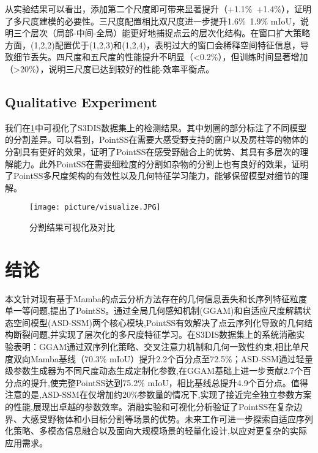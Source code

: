 \documentclass[preprint,12pt]{elsarticle}
\begin{document}
从实验结果可以看出，添加第二个尺度即可带来显著提升（+1.1\%~+1.4\%），证明了多尺度建模的必要性。三尺度配置相比双尺度进一步提升1.6\%~1.9\% mIoU，说明三个层次（局部-中间-全局）能更好地捕捉点云的层次化结构。在窗口扩大策略方面，(1,2,2)配置优于(1,2,3)和(1,2,4)，表明过大的窗口会稀释空间特征信息，导致细节丢失。四尺度和五尺度的性能提升不明显（<0.2\%），但训练时间显著增加（>20\%），说明三尺度已达到较好的性能-效率平衡点。



\subsection{Qualitative Experiment}
我们在\cref{fig:vis}中可视化了S3DIS数据集上的检测结果。其中划圈的部分标注了不同模型的分割差异。可以看到，PointSS在需要大感受野支持的窗户以及房柱等的物体的分割具有更好的效果，证明了PointSS在感受野融合上的优势、其具有多层次的理解能力。此外PointSS在需要细粒度的分割如杂物的分割上也有良好的效果，证明了PointSS多尺度架构的有效性以及几何特征学习能力，能够保留模型对细节的理解。
\begin{figure}[htbp]
	\centering
	\texttt{[image: picture/visualize.JPG]}
	\caption{分割结果可视化及对比}
	\label{fig:vis}
\end{figure}



\section{结论}
本文针对现有基于Mamba的点云分析方法存在的几何信息丢失和长序列特征粒度单一等问题,提出了PointSS。通过全局几何感知机制(GGAM)和自适应尺度解耦状态空间模型(ASD-SSM)两个核心模块,PointSS有效解决了点云序列化导致的几何结构断裂问题,并实现了层次化的多尺度特征学习。在S3DIS数据集上的系统消融实验表明：GGAM通过双序列化策略、交叉注意力机制和几何一致性约束,相比单尺度双向Mamba基线（70.3\% mIoU）提升2.2个百分点至72.5\%；ASD-SSM通过轻量级参数生成器为不同尺度动态生成定制化参数,在GGAM基础上进一步贡献2.7个百分点的提升,使完整PointSS达到75.2\% mIoU，相比基线总提升4.9个百分点。值得注意的是,ASD-SSM在仅增加约20\%参数量的情况下,实现了接近完全独立参数方案的性能,展现出卓越的参数效率。消融实验和可视化分析验证了PointSS在复杂边界、大感受野物体和小目标分割等场景的优势。未来工作可进一步探索自适应序列化策略、多模态信息融合以及面向大规模场景的轻量化设计,以应对更复杂的实际应用需求。

\end{document}

